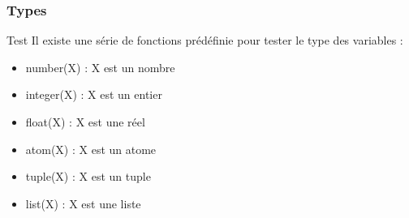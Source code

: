 \begin{frame}[fragile]
  \frametitle{Types}

  \begin{block}{Test}
    Il existe une série de fonctions prédéfinie pour tester le type des
    variables :
    \begin{itemize}
      \item number(X) : X est un nombre
      \item integer(X) : X est un entier
      \item float(X) : X est une réel
      \item atom(X) : X est un atome
      \item tuple(X) : X est un tuple
      \item list(X) : X est une liste
    \end{itemize}
  \end{block}

\end{frame}

